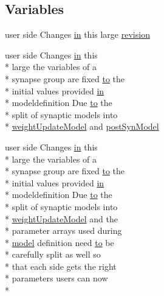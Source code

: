 \subsection*{Variables}
\begin{DoxyCompactItemize}
\item 
user side Changes \hyperlink{README_8txt_a148897a6b2cc9cff25af80abb13426b0}{in} this large \hyperlink{changesSummary_8txt_a161f8ef2ee21ae03c8fe9e8e094d132c}{revision}
\item 
user side Changes \hyperlink{README_8txt_a148897a6b2cc9cff25af80abb13426b0}{in} this \\*
large the variables of a \\*
synapse group are fixed \hyperlink{README_8txt_add1f2ee32acc15ef77f839d4382c9768}{to} the \\*
initial values provided \hyperlink{README_8txt_a148897a6b2cc9cff25af80abb13426b0}{in} \\*
modeldefinition Due \hyperlink{README_8txt_add1f2ee32acc15ef77f839d4382c9768}{to} the \\*
split of synaptic models into \\*
\hyperlink{classweightUpdateModel}{weight\+Update\+Model} and \hyperlink{changesSummary_8txt_a7299bf581e667dd1bdc7788c980b3711}{post\+Syn\+Model}
\item 
user side Changes \hyperlink{README_8txt_a148897a6b2cc9cff25af80abb13426b0}{in} this \\*
large the variables of a \\*
synapse group are fixed \hyperlink{README_8txt_add1f2ee32acc15ef77f839d4382c9768}{to} the \\*
initial values provided \hyperlink{README_8txt_a148897a6b2cc9cff25af80abb13426b0}{in} \\*
modeldefinition Due \hyperlink{README_8txt_add1f2ee32acc15ef77f839d4382c9768}{to} the \\*
split of synaptic models into \\*
\hyperlink{classweightUpdateModel}{weight\+Update\+Model} and the \\*
parameter arrays used during \\*
\hyperlink{README_8txt_a69fd801b7213948c12d9dd7eebb3ed14}{model} definition need \hyperlink{README_8txt_add1f2ee32acc15ef77f839d4382c9768}{to} be \\*
carefully split as well so \\*
that each side gets the right \\*
parameters users can now \\*

\end{DoxyCompactItemize}
